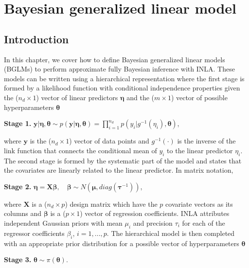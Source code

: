 \documentclass[a4paper,11pt]{report}
\def\bs#1{\ensuremath{\boldsymbol{#1}}} %
\begin{document}
\clearpage




\chapter{Bayesian generalized linear model}

\section{Introduction}\label{bglm:sec:intro}

In this chapter, we cover how to define Bayesian generalized linear
models (BGLMs) to perform approximate fully Bayesian inference with
INLA. These models can be written using a hierarchical representation
where the first stage is formed by a likelihood function with
conditional independence properties given the ($n_d \times 1$) vector
of linear predictors $\bs{\eta}$ and the ($m \times 1$) vector of
possible hyperparameters $\bs{\theta}$
\begin{list}{}{\leftmargin=5em}
\item[\textbf{Stage 1.}] $\bs{y}|\bs{\eta},\bs{\theta} \sim
    p(\bs{y}|\bs{\eta},\bs{\theta}) = \prod _{i=1}^{n_d} p(y_i|g^{-1}
    (\eta _i), \bs{\theta})$,
\end{list}
where $\bs{y}$ is the ($n_d \times 1$) vector of data points and
$g^{-1}(\cdot)$ is the inverse of the link function that connects the
conditional mean of $y_i$ to the linear predictor $\eta _i$.  The
second stage is formed by the systematic part of the model and states
that the covariates are linearly related to the linear predictor. In
matrix notation,
\begin{list}{}{\leftmargin=5em}
\item[\textbf{Stage 2.}] $\bs{\eta} = \bs{X} \bs{\beta}, \quad
    \bs{\beta} \sim N(\bs{\mu}, diag(\bs{\tau}^{-1}))$,
\end{list}
where $\bs{X}$ is a ($n_d \times p$) design matrix which have the $p$
covariate vectors as its columns and $\bs{\beta}$ is a ($p \times 1$)
vector of regression coefficients. INLA attributes independent
Gaussian priors with mean $\mu _i$ and precision $\tau_i$ for each of
the regressor coefficients $\beta_i$, $i = 1,...,p$.  The hierarchical
model is then completed with an appropriate prior distribution for a
possible vector of hyperparameters $\bs{\theta}$
\begin{list}{}{\leftmargin=5em}
  \item[\textbf{Stage 3.}] $\bs{\theta} \sim \pi(\bs{\theta})$.
\end{list}
\end{document}
